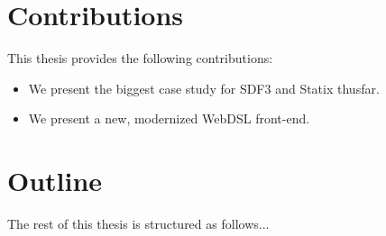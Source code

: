 

  \section{Contributions}
    This thesis provides the following contributions:

    \begin{itemize}
      \item We present the biggest case study for SDF3 and Statix thusfar.
      \item We present a new, modernized WebDSL front-end.
    \end{itemize}

  \section{Outline}
    The rest of this thesis is structured as follows... %
